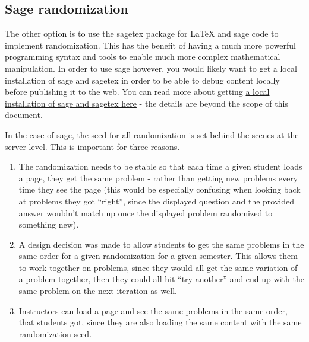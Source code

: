 \documentclass{ximera}
\begin{document}
    \subsection*{Sage randomization}
        The other option is to use the sagetex package for LaTeX and sage code to implement randomization. This has the benefit of having a much more powerful programming syntax and tools to enable much more complex mathematical manipulation. In order to use sage however, you would likely want to get a local installation of sage and sagetex in order to be able to debug content locally before publishing it to the web. You can read more about getting \href{https://doc.sagemath.org/html/en/reference/misc/sagetex.html}{a local installation of sage and sagetex here} - the details are beyond the scope of this document.
        
        In the case of sage, the seed for all randomization is set behind the scenes at the server level. This is important for three reasons.
        \begin{enumerate}
            \item The randomization needs to be stable so that each time a given student loads a page, they get the same problem - rather than getting new problems every time they see the page (this would be especially confusing when looking back at problems they got ``right'', since the displayed question and the provided answer wouldn't match up once the displayed problem randomized to something new).
            \item A design decision was made to allow students to get the same problems in the same order for a given randomization for a given semester. This allows them to work together on problems, since they would all get the same variation of a problem together, then they could all hit ``try another'' and end up with the same problem on the next iteration as well. 
            \item Instructors can load a page and see the same problems in the same order, that students got, since they are also loading the same content with the same randomization seed.
        \end{enumerate}
        
        
        
\end{document}
